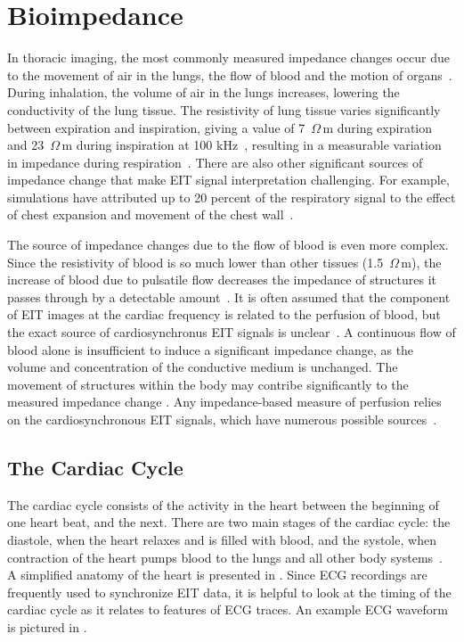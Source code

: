 \section{Bioimpedance}
\label{sec:bioimpedance}
In thoracic imaging, the most commonly measured 
impedance changes occur due to the movement 
of air in the lungs, the flow of blood and the motion of 
organs~\parencite{adler_electrical_2017}. 
During inhalation, the volume of air in the lungs increases, lowering the 
conductivity of the lung tissue. 
The resistivity of lung tissue varies significantly
between expiration and inspiration, giving a value of 7~$\Omega$\,m during expiration
and 23~$\Omega$\,m during inspiration at 100 kHz~\parencite{witsoe_electrical_1967},
resulting in a
measurable variation in impedance during respiration~\parencite{eyuboglu_vivo_1989}. 
There are also other 
significant sources of impedance change that make EIT signal interpretation 
challenging. For example, simulations have attributed up to 20
percent of the respiratory signal to the effect of 
chest expansion and movement of the chest 
wall~\parencite{adler_impedance_1994}.

The source of impedance changes due to the flow of blood is even more complex. 
Since the resistivity of blood is so much lower than other tissues 
(1.5~$\Omega$\,m), the increase of blood due to pulsatile 
flow decreases the impedance of structures it passes through 
by a detectable amount~\parencite{eyuboglu_vivo_1989}.
It is often assumed that the component of EIT images at the cardiac 
frequency is related to the perfusion of blood, but the exact source of
cardiosynchronus EIT signals is 
unclear~\parencite{patterson_impedance_2010,nguyen_review_2012}.
A continuous flow of blood alone is insufficient 
to induce a significant impedance change, 
as the volume and concentration of the conductive medium is unchanged. 
The movement of structures within the body may contribe 
significantly to the measured impedance 
change \parencite{braun_limitations_2018}.
Any impedance-based measure of perfusion relies on the cardiosynchronous 
EIT signals, which have numerous possible sources~\parencite{adler_origins_2017}. 

\subsection{The Cardiac Cycle}
The cardiac cycle consists of the activity in the heart between the
beginning of one heart beat, and the next. There are two main stages 
of the cardiac cycle: the diastole, when the heart relaxes and is filled 
with blood, and the systole, when contraction of the heart pumps blood to
the lungs and all other body systems~\parencite{pappano_cardiovascular_2019}. 
A simplified anatomy of the heart is 
presented in . 
Since ECG recordings are frequently used to synchronize 
EIT data, it is helpful to look at the timing of the cardiac cycle as it 
relates to features of ECG traces. An example ECG waveform is pictured in 
. 


